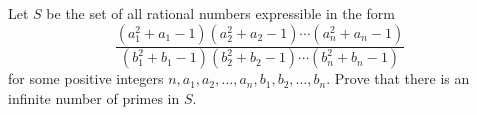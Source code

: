 Let $S$ be the set of all rational numbers expressible in the form \[\frac{(a_1^2+a_1-1)(a_2^2+a_2-1)\cdots(a_n^2+a_n-1)}{(b_1^2+b_1-1)(b_2^2+b_2-1)\cdots(b_n^2+b_n-1)}\] for some positive integers $n,a_1,a_2,\ldots,a_n,b_1,b_2,\ldots,b_n$. Prove that there is an infinite number of primes in $S$.